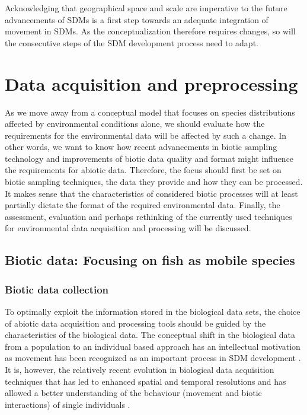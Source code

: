 \documentclass[12pt,authoryear]{elsarticle}
\begin{document}
Acknowledging that geographical space and scale are imperative to the future advancements of SDMs is a first step towards an adequate integration of movement in SDMs. As the conceptualization therefore requires changes, so will the consecutive steps of the SDM development process need to adapt.

\section{Data acquisition and preprocessing}

As we move away from a conceptual model that focuses on species distributions affected by environmental conditions alone, we should evaluate how the requirements for the environmental data will be affected by such a change. In other words, we want to know how recent advancements in biotic sampling technology and improvements of biotic data quality and format might influence the requirements for abiotic data. Therefore, the focus should first be set on biotic sampling techniques, the data they provide and how they can be processed. It makes sense that the characteristics of considered biotic processes will at least partially dictate the format of the required environmental data. Finally, the assessment, evaluation and perhaps rethinking of the currently used techniques for environmental data acquisition and processing will be discussed.

\subsection{Biotic data: Focusing on fish as mobile species}

\subsubsection{Biotic data collection}
\label{Biotic:data:collection}

To optimally exploit the information stored in the biological data sets, the choice of abiotic data acquisition and processing tools should be guided by the characteristics of the biological data. The conceptual shift in the biological data from a population to an individual based approach has an intellectual motivation as movement has been recognized as an important process in SDM development \citep{Soberon2005,Holloway2016}. It is, however, the relatively recent evolution in biological data acquisition techniques that has led to enhanced spatial and temporal resolutions and has allowed a better understanding of the behaviour (movement and biotic interactions) of single individuals \citep{Hussey2015}.
\end{document}
